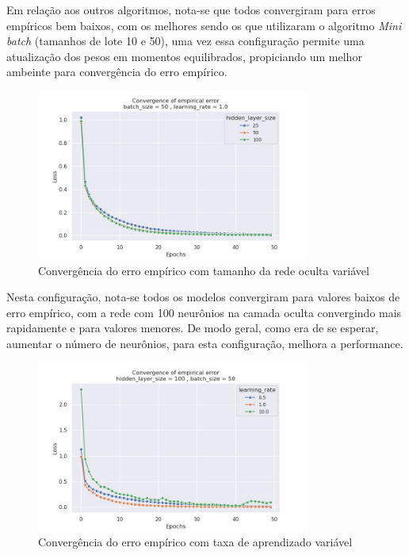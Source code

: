 \documentclass{article}
\begin{document}
Em relação aos outros algoritmos, nota-se que todos convergiram para erros empíricos bem baixos, com os melhores sendo os que utilizaram o algoritmo \textit{Mini batch} (tamanhos de lote 10 e 50), uma vez
essa configuração permite uma atualização dos pesos em momentos equilibrados, propiciando um melhor ambeinte para convergência do erro empírico.

\begin{figure}[H]
{\centering
\includegraphics[width=0.8\textwidth]{images/empirical_error/hidden_layer_size_not_fixed.jpg}
\caption{Convergência do erro empírico com tamanho da rede oculta variável}}
\end{figure}

Nesta configuração, nota-se todos os modelos convergiram para valores baixos de erro empírico, com a rede com 100 neurônios na camada oculta convergindo
mais rapidamente e para valores menores. De modo geral, como era de se esperar, aumentar o número de neurônios, para esta configuração, melhora a performance.

\begin{figure}[H]
{\centering
\includegraphics[width=0.8\textwidth]{images/empirical_error/learning_rate_not_fixed.jpg}
\caption{Convergência do erro empírico com taxa de aprendizado variável}}
\end{figure}
\end{document}
